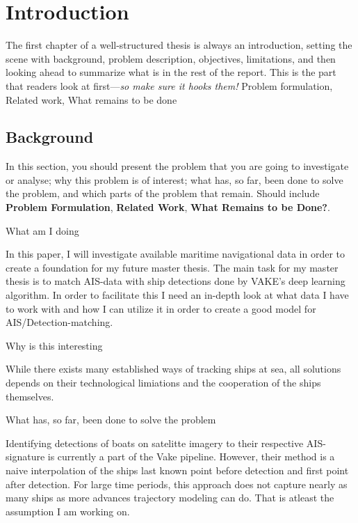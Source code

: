 \chapter{Introduction}
\label{chp:introduction}
\begin{info}
	The first chapter of a well-structured thesis is always an introduction, setting the scene with background, problem description, objectives, limitations, and then looking ahead to summarize what is in the rest of the report. This is the part that readers look at first---\emph{so make sure it hooks them!} Problem formulation, Related work, What remains to be done
\end{info}


\section{Background}
\label{sec:background}
\begin{info}
	In this section, you should present the problem that you are going to investigate or analyse; why this problem is of interest; what has, so far, been done to solve the problem, and which parts of the problem that remain. Should include \textbf{Problem Formulation}, \textbf{Related Work}, \textbf{What Remains to be Done?}.
\end{info}
\begin{info}
	What am I doing
\end{info}
In this paper, I will investigate available maritime navigational data in order to create a foundation for my future master thesis. The main task for my master thesis is to match AIS-data with ship detections done by VAKE's deep learning algorithm. In order to facilitate this I need an in-depth look at what data I have to work with and how I can utilize it in order to create a good model for AIS/Detection-matching.

\begin{info}
	Why is this interesting
\end{info}

While there exists many established ways of tracking ships at sea, all solutions depends on their technological limiations and the cooperation of the ships themselves.

\begin{info}
	What has, so far, been done to solve the problem
\end{info}
Identifying detections of boats on satelitte imagery to their respective AIS-signature is currently a part of the Vake pipeline. However, their method is a naive interpolation of the ships last known point before detection and first point after detection. For large time periods, this approach does not capture nearly as many ships as more advances trajectory modeling can do. That is atleast the assumption I am working on.

